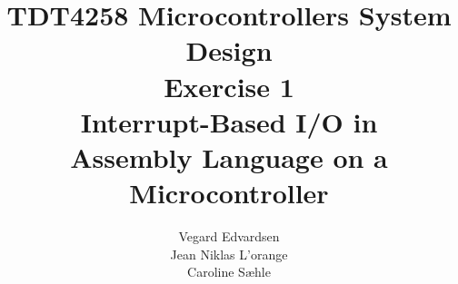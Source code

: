 \documentclass[a4paper,10pt]{article}
\title{TDT4258 Microcontrollers System Design\\Exercise 1\\[20pt]Interrupt-Based I/O in\\Assembly Language on a Microcontroller}
\author{Vegard Edvardsen\\Jean Niklas L'orange\\Caroline Sæhle}
\begin{document}
\maketitle

\begin{abstract}

\end{abstract}

\newpage
\tableofcontents
\newpage







\end{document}
